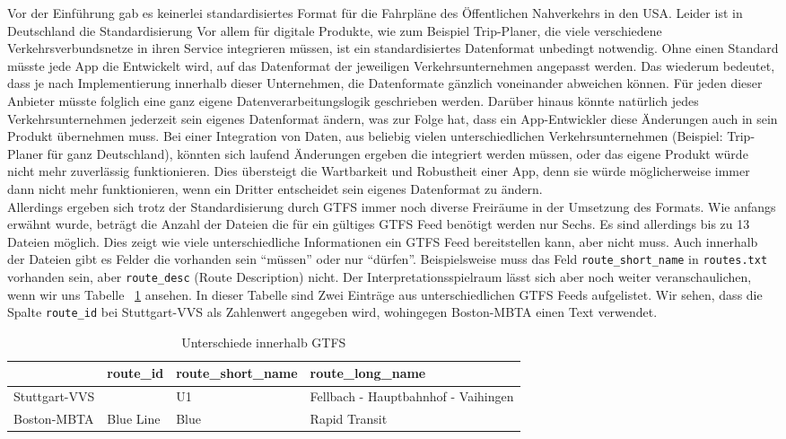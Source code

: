 \begin{newpage}
		Vor der Einführung gab es keinerlei standardisiertes Format für die Fahrpläne des Öffentlichen Nahverkehrs in den USA. Leider ist in Deutschland die Standardisierung Vor allem für digitale Produkte, wie zum Beispiel Trip-Planer, die viele verschiedene Verkehrsverbundsnetze in ihren Service integrieren müssen, ist ein standardisiertes Datenformat unbedingt notwendig. 
		Ohne einen Standard müsste jede App die Entwickelt wird, auf das Datenformat der jeweiligen Verkehrsunternehmen angepasst werden. Das wiederum bedeutet, dass je nach Implementierung innerhalb dieser Unternehmen, die Datenformate gänzlich voneinander abweichen können. Für jeden dieser Anbieter müsste folglich eine ganz eigene Datenverarbeitungslogik geschrieben werden.
    Darüber hinaus könnte natürlich jedes Verkehrsunternehmen jederzeit sein eigenes Datenformat ändern, was zur Folge hat, dass ein App-Entwickler diese Änderungen auch in sein Produkt übernehmen muss. Bei einer Integration von Daten, aus beliebig vielen unterschiedlichen Verkehrsunternehmen (Beispiel: Trip-Planer für ganz Deutschland), könnten sich laufend Änderungen ergeben die integriert werden müssen, oder das eigene Produkt würde nicht mehr zuverlässig funktionieren. Dies übersteigt die Wartbarkeit und Robustheit einer App, denn sie würde möglicherweise immer dann nicht mehr funktionieren, wenn ein Dritter entscheidet sein eigenes Datenformat zu ändern.\\

    Allerdings ergeben sich trotz der Standardisierung durch GTFS immer noch diverse Freiräume in der Umsetzung des Formats. Wie anfangs erwähnt wurde, beträgt die Anzahl der Dateien die für ein gültiges GTFS Feed benötigt werden nur Sechs. Es sind allerdings bis zu 13 Dateien möglich. Dies zeigt wie viele unterschiedliche Informationen ein GTFS Feed bereitstellen kann, aber nicht muss. 
    Auch innerhalb der Dateien gibt es Felder die vorhanden sein "`müssen"' oder nur "`dürfen"'. Beispielsweise muss das Feld \texttt{route\_short\_name} in \texttt{routes.txt} vorhanden sein, aber \texttt{route\_desc} (Route Description) nicht. Der Interpretationsspielraum lässt sich aber noch weiter veranschaulichen, wenn wir uns Tabelle ~\ref{table:gtfs_differences} ansehen. In dieser Tabelle sind Zwei Einträge aus unterschiedlichen GTFS Feeds aufgelistet.
    Wir sehen, dass die Spalte \texttt{route\_id} bei Stuttgart-VVS als Zahlenwert angegeben wird, wohingegen Boston-MBTA einen Text verwendet.

    \begin{longtable}{|>{\raggedright \arraybackslash}p{3.0cm}|>{\raggedright \arraybackslash}p{1.5cm}|>{\raggedright \arraybackslash}p{3.5cm}|>{\raggedright \arraybackslash}p{6.0cm}|}
    \caption{Unterschiede innerhalb GTFS} 
    \label{table:gtfs_differences}\\
      \hline
       & route\_id & route\_short\_name & route\_long\_name\\
      \hline
      Stuttgart-VVS & 379 & U1 & Fellbach - Hauptbahnhof - Vaihingen\\
      \hline
      Boston-MBTA & Blue Line & Blue & Rapid Transit\\
      \hline
    \end{longtable}


\end{newpage}
